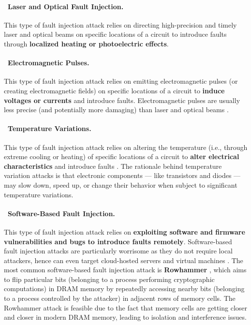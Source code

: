 
\paragraph*{\faBullseye~Laser and Optical Fault Injection.} This type of fault injection attack relies on directing high-precision and timely laser \cite{skorobogatov_optical_2003} and optical \cite{schmidt_optical_2007} beams on specific locations of a circuit to introduce faults through \textbf{localized heating or photoelectric effects}.

\paragraph*{\faMagnet~Electromagnetic Pulses.} This type of fault injection attack relies on emitting electromagnetic pulses (or creating electromagnetic fields) on specific locations of a circuit to \textbf{induce voltages or currents} and introduce faults. Electromagnetic pulses are usually less precise (and potentially more damaging) than laser and optical beams \cite{chiu_sok_2023}.

\paragraph*{\faFire~Temperature Variations.} This type of fault injection attack relies on altering the temperature (i.e., through extreme cooling or heating) of specific locations of a circuit to \textbf{alter electrical characteristics} and introduce faults \cite{francillon_temperature_2014}. The rationale behind temperature variation attacks is that electronic components --- like transistors and diodes --- may slow down, speed up, or change their behavior when subject to significant temperature variations.

\paragraph*{\faLaptopCode~Software-Based Fault Injection.} This type of fault injection attack relies on \textbf{exploiting software and firmware vulnerabilities and bugs to introduce faults remotely}. Software-based fault injection attacks are particularly worrisome as they do not require local attackers, hence can even target cloud-hosted servers and virtual machines \cite{murdock_plundervolt_2020,zhang_cachewarp_2024}. The most common software-based fault injection attack is \textbf{Rowhammer} \cite{koksal_jolt_2002,kim_flipping_2014}, which aims to flip particular bits (belonging to a process performing cryptographic computations) in DRAM memory by repeatedly accessing nearby bits (belonging to a process controlled by the attacker) in adjacent rows of memory cells. The Rowhammer attack is feasible due to the fact that memory cells are getting closer and closer in modern DRAM memory, leading to isolation and interference issues.

